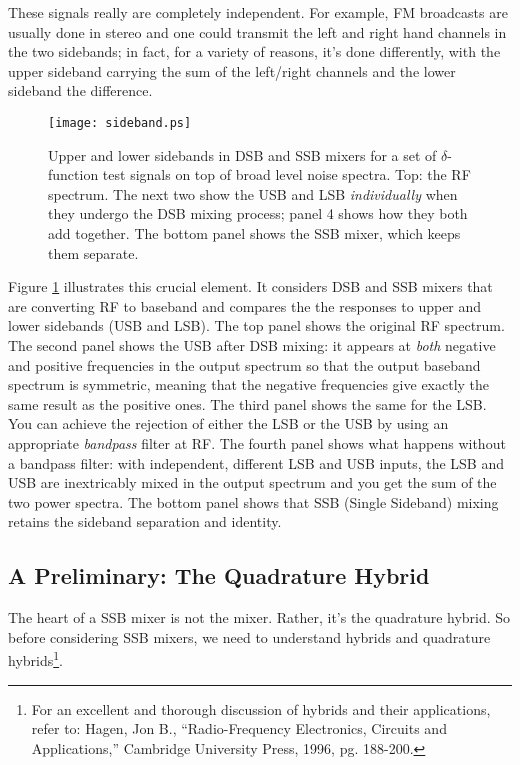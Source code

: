 \documentclass[11pt,preprint]{aastex}
\begin{document}
        These signals really are completely independent. For example, FM
broadcasts are usually done in stereo and one could transmit the left
and right hand channels in the two sidebands; in fact, for a variety of
reasons, it's done differently, with the upper sideband carrying the sum
of the left/right channels and the lower sideband the difference.

\begin{figure}[p!]
%
\hspace{-0.75in}
\texttt{[image: sideband.ps]}
\caption{Upper and lower sidebands in DSB and SSB mixers for a set of
$\delta$-function test signals on top of broad level noise spectra. Top:
the RF spectrum. The next two show the USB and LSB {\it individually}
when they undergo the DSB mixing process; panel 4 shows how they both
add together. The bottom panel shows the SSB mixer, which keeps them
separate. \label{sideband}}
\end{figure}

Figure \ref{sideband} illustrates this crucial element. It considers
DSB and SSB mixers that are converting RF to baseband and compares the
the responses to upper and lower sidebands (USB and LSB). The top panel
shows the original RF spectrum. The second panel shows the USB after DSB
mixing: it appears at {\it both} negative and positive frequencies in
the output spectrum so that the output baseband spectrum is symmetric,
meaning that the negative frequencies give exactly the same result as
the positive ones. The third panel shows the same for the LSB. You can
achieve the rejection of either the LSB or the USB by using an
appropriate {\it bandpass} filter at RF. The fourth panel shows what
happens without a bandpass filter: with independent, different LSB and
USB inputs, the LSB and USB are inextricably mixed in the output
spectrum and you get the sum of the two power spectra. The bottom panel
shows that SSB (Single Sideband) mixing retains the sideband separation
and identity.



\subsection{A Preliminary: The Quadrature Hybrid}

        The heart of a SSB mixer is not the mixer. Rather, it's the
quadrature hybrid. So before considering SSB mixers, we need to
understand hybrids and quadrature hybrids\footnote{For an excellent and
thorough discussion of hybrids and their applications, refer to:  Hagen,
Jon B., ``Radio-Frequency Electronics, Circuits and Applications,''
Cambridge University Press, 1996, pg. 188-200.}.
\end{document}
